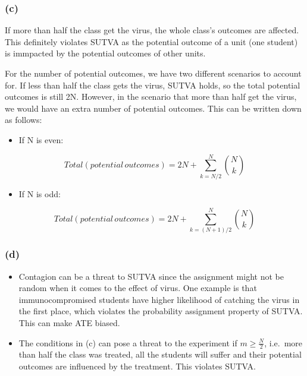\documentclass[]{article}
\providecommand{\tightlist}{%
  \setlength{\itemsep}{0pt}\setlength{\parskip}{0pt}}
\begin{document}
\hypertarget{c-1}{%
\subsubsection{(c)}\label{c-1}}

If more than half the class get the virus, the whole class's outcomes
are affected. This definitely violates SUTVA as the potential outcome of
a unit (one student) is immpacted by the potential outcomes of other
units.

For the number of potential outcomes, we have two different scenarios to
account for. If less than half the class gets the virus, SUTVA holds, so
the total potential outcomes is still 2N. However, in the scenario that
more than half get the virus, we would have an extra number of potential
outcomes. This can be written down as follows:

\begin{itemize}
\tightlist
\item
  If N is even:
\end{itemize}

\[ Total(potential\,outcomes) = 2N + \sum_{k = N/2}^N {N \choose k}\]

\begin{itemize}
\tightlist
\item
  If N is odd:
\end{itemize}

\[ Total(potential\,outcomes) = 2N + \sum_{k = (N+1)/2}^N {N \choose k} \]

\hypertarget{d-1}{%
\subsubsection{(d)}\label{d-1}}

\begin{itemize}
\tightlist
\item
  Contagion can be a threat to SUTVA since the assignment might not be
  random when it comes to the effect of virus. One example is that
  immunocompromised students have higher likelihood of catching the
  virus in the first place, which violates the probability assignment
  property of SUTVA. This can make ATE biased.
\item
  The conditions in (c) can pose a threat to the experiment if
  \(m \geq \frac{N}{2}\), i.e.~more than half the class was treated, all
  the students will suffer and their potential outcomes are influenced
  by the treatment. This violates SUTVA.
\end{itemize}
\end{document}
